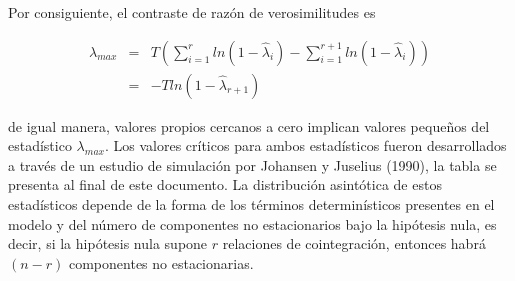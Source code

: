 Por consiguiente, el contraste de razón de verosimilitudes es

\begin{eqnarray}
\lambda_{max} &=& T\left ( \sum_{i=1}^r ln(1-\widehat{\lambda}_i) - \sum_{i=1}^{r+1} ln(1-\widehat{\lambda}_i) \right ) \nonumber \\
 &=& -T  ln(1-\widehat{\lambda}_{r+1}) 
\end{eqnarray}

de igual manera, valores propios cercanos a cero implican valores pequeños del estadístico $\lambda_{max}$. Los valores críticos para ambos estadísticos fueron desarrollados a través de un estudio de simulación por Johansen y Juselius (1990), la tabla se presenta al final de este documento. La distribución asintótica de estos estadísticos depende de la forma de los términos determinísticos presentes en el modelo y  del número de componentes no estacionarios bajo la hipótesis nula, es decir, si la hipótesis nula supone $r$ relaciones de cointegración, entonces habrá $(n-r)$  componentes no estacionarias.   


